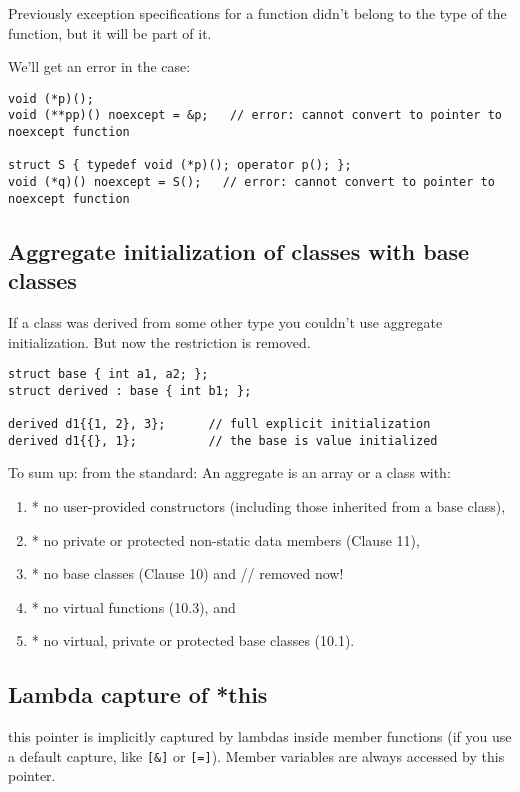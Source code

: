 Previously exception specifications for a function didn’t belong to the type of the function, but it will be part of it.

We’ll get an error in the case:

\begin{verbatim}
void (*p)();
void (**pp)() noexcept = &p;   // error: cannot convert to pointer to noexcept function

struct S { typedef void (*p)(); operator p(); };
void (*q)() noexcept = S();   // error: cannot convert to pointer to noexcept function
\end{verbatim}

\subsection{Aggregate initialization of classes with base classes}

If a class was derived from some other type you couldn’t use aggregate initialization. But now the restriction is removed.

\begin{verbatim}
struct base { int a1, a2; };
struct derived : base { int b1; };

derived d1{{1, 2}, 3};      // full explicit initialization
derived d1{{}, 1};          // the base is value initialized
\end{verbatim}

To sum up: from the standard:
An aggregate is an array or a class with: 
\begin{enumerate}
\item * no user-provided constructors (including those inherited from a base class), 
\item * no private or protected non-static data members (Clause 11), 
\item * no base classes (Clause 10) and // removed now! 
\item * no virtual functions (10.3), and 
\item * no virtual, private or protected base classes (10.1). 
\end{enumerate}

\subsection{Lambda capture of *this}

this pointer is implicitly captured by lambdas inside member functions (if you use a default capture, like \texttt{[&]} or \texttt{[=]}). Member variables are always accessed by this pointer.


